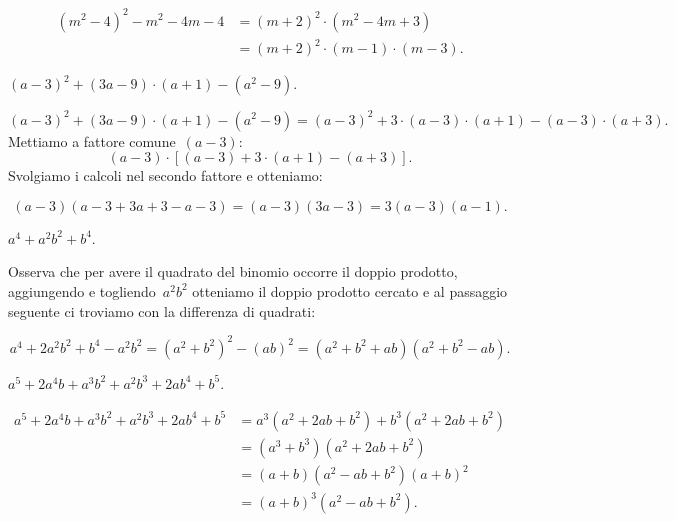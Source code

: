 \begin{exrig}
\begin{esempio}
\begin{align*}
\left(m^{2}-4\right)^2-m^2-4m-4 &=\left(m+2\right)^2\cdot \left( m^2-4m+3 \right)\\
&=\left(m+2\right)^{2}\cdot \left(m-1\right)\cdot \left(m-3\right).
\end{align*}
 \end{esempio}

 \begin{esempio}
 $\left(a-3\right)^{2}+\left(3a-9\right)\cdot\left(a+1\right)-\left(a^{2}-9\right)$.


\begin{equation*}
\left(a-3\right)^{2}+\left(3a-9\right)\cdot\left(a+1\right)-\left(a^{2}-9\right)%
=\left(a-3\right)^{2}+3\cdot \left(a-3\right)\cdot%
\left(a+1\right)-\left(a-3\right)\cdot \left(a+3\right).
\end{equation*}
Mettiamo a fattore comune~$(a-3)$:
\begin{equation*}
(a-3)\cdot \left[\left(a-3\right)+3\cdot
\left(a+1\right)-\left(a+3\right)\right].
\end{equation*}
Svolgiamo i calcoli nel secondo fattore e otteniamo:

\begin{equation*}
(a-3)(a-3+3a+3-a-3)=(a-3)(3a-3)=3(a-3)(a-1).
\end{equation*}
 \end{esempio}

 \begin{esempio}
 $a^4+a^{2}b^{2}+b^4$.

Osserva che per avere il quadrato del binomio occorre il doppio
prodotto, aggiungendo e togliendo~$a^{2}b^{2}$ otteniamo il doppio
prodotto cercato e al passaggio seguente ci troviamo con la differenza
di quadrati:

\[a^4+2a^2b^2+b^4 -a^2b^2=\left(a^2+b^2\right)^2-\left(ab\right)^2%
 =\left(a^2+b^2+ab\right)\left(a^2+b^2-ab\right).\]

 \end{esempio}

 \begin{esempio}
 $a^{5}+2a^{4}b+a^{3}b^{2}+a^{2}b^{3}+2ab^{4}+b^{5}$.

 \begin{align*}
  a^{5}+2a^{4}b+a^{3}b^{2}+a^{2}b^{3}+2ab^{4}+b^{5}&=a^{3}\left(a^{2}+2ab+b^{2}\right)+b^{3}\left(a^{2}+2ab+b^{2}\right)\\
  &=\left(a^{3}+b^{3}\right)\left(a^{2}+2ab+b^{2}\right)\\
  &=\left(a+b\right)\left(a^{2}-ab+b^{2}\right)\left(a+b\right)^{2}\\
  &=\left(a+b\right)^{3}\left(a^{2}-ab+b^{2}\right).
 \end{align*}
 \end{esempio}


\end{exrig}
